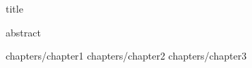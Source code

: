\documentclass[12pt]{book}
\begin{document}
\frontmatter



{title}

{abstract}
\tableofcontents

\restoregeometry

\mainmatter

{chapters/chapter1}
{chapters/chapter2}
{chapters/chapter3}

\backmatter
\end{document}
